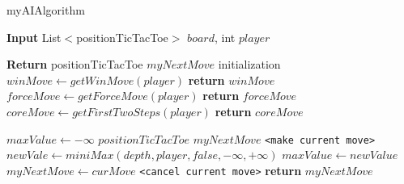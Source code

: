 \documentclass[a4paper]{article}
\begin{document}
\begin{algorithm}
\caption{myAIAlgorithm}
\begin{algorithmic}[]

\State \textbf{Input} List$<$positionTicTacToe$>$ $board$, int $player$

\State \textbf{Return} positionTicTacToe $myNextMove$
\State
{}     
\State
\State initialization
\State
\State $ winMove \gets getWinMove(player)$  
    \State  \textbf{return} $winMove$
\EndIf
\State
\State $ forceMove \gets getForceMove(player)$  
    \State  \textbf{return} $forceMove$
\EndIf
\State
\State $ coreMove \gets getFirstTwoSteps(player)$  
    \State  \textbf{return} $coreMove$
\EndIf
\State

\State $maxValue \gets -\infty$
\State $positionTicTacToe$ $myNextMove$
\State
\Do {}
        \State \texttt{<make current move>}
	  \State $newVale \gets miniMax(depth, player, false, -\infty, +\infty)$
    	           \State  $maxValue \gets newValue$
		     \State $myNextMove \gets curMove$
         \EndIf
	   \State \texttt{<cancel current move>}  
      \EndFor
\State \textbf{return} $myNextMove$
\EndProcedure
\end{algorithmic}
\end{algorithm}
\end{document}
